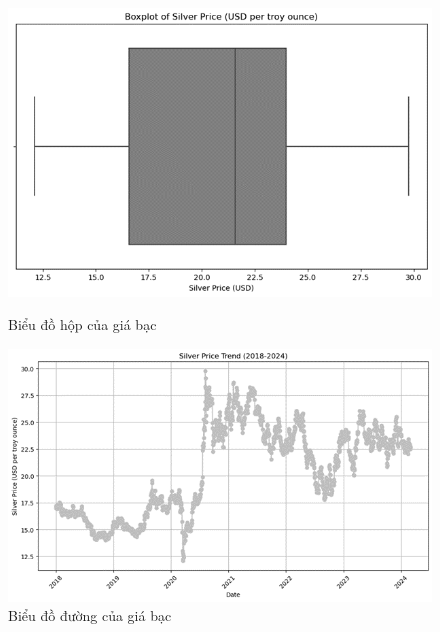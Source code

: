 \documentclass[conference]{IEEEtran}
\begin{document}
\begin{figure}[H]
    \centering
    \begin{minipage}{0.23\textwidth}
    \centering
    \includegraphics[width=1\textwidth]{bibliography/Figure/boxplot_silver.png}
    \caption{Biểu đồ hộp của giá bạc}
    \label{fig:3}
    \end{minipage}
    \hfill
    \begin{minipage}{0.23\textwidth}
    \centering
    \includegraphics[width=1\textwidth]{bibliography/Figure/line_silver.png}
    \caption{Biểu đồ đường của giá bạc}
    \label{fig:4}
    \end{minipage}
\end{figure}
\end{document}
